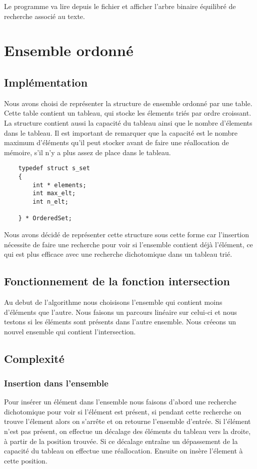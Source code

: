 \documentclass[11pt]{article}
\begin{document}
    Le programme va lire depuis le fichier et afficher l'arbre binaire équilibré
    de recherche associé au texte.



\section{Ensemble ordonné}

    \subsection{Implémentation}
    Nous avons choisi de représenter
    la structure de ensemble ordonné par une table.
    Cette table contient un tableau, qui stocke les
    élements triés par ordre croissant. La structure contient aussi
    la capacité du tableau ainsi que le nombre d'élements dans le tableau.
    Il est important de remarquer que la capacité est le
    nombre maximum d'éléments qu'il peut stocker
    avant de faire une réallocation de mémoire, s'il n'y a plus assez
    de place dans le tableau.

    \begin{verbatim}
    typedef struct s_set
    {
        int * elements;
        int max_elt;
        int n_elt;

    } * OrderedSet;
    \end{verbatim}

    Nous avons décidé de représenter cette structure sous cette forme
    car l'insertion nécessite de faire une recherche
    pour voir si l'ensemble contient déjà l'élément, ce qui est plus
    efficace avec une recherche dichotomique dans un tableau trié.

    \subsection{Fonctionnement de la fonction intersection}
    Au debut de l'algorithme nous choisisons l'ensemble qui contient moins
    d'éléments que l'autre. Nous faisons un parcours linéaire sur celui-ci
    et nous testons si les éléments sont présents dans l'autre ensemble.
    Nous créeons un nouvel ensemble qui contient l'intersection.

    \subsection{Complexité}

        \subsubsection{Insertion dans l'ensemble}
        Pour insérer un élément dans l'ensemble nous faisons d'abord une
        recherche dichotomique pour voir si l'élément est présent, si
        pendant cette recherche on trouve l'élement alors on s'arrête et
        on retourne l'ensemble d'entrée. Si l'élément n'est pas présent,
        on effectue un décalage des éléments du tableau vers la droite,
        à partir de la position trouvée. Si ce décalage entraîne un dépassement
        de la capacité du tableau on effectue une réallocation.
        Ensuite on insère l'élement à cette position.\\
\end{document}
